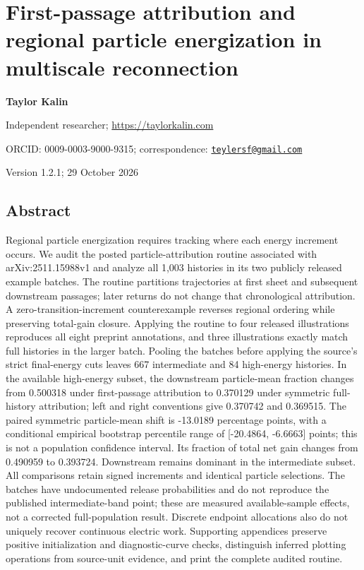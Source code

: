 \section{First-passage attribution and regional particle energization in
multiscale
reconnection}\label{first-passage-attribution-and-regional-particle-energization-in-multiscale-reconnection}

\textbf{Taylor Kalin}

Independent researcher; \url{https://taylorkalin.com}

ORCID: 0009-0003-9000-9315; correspondence:
\href{mailto:teylersf@gmail.com}{\nolinkurl{teylersf@gmail.com}}

Version 1.2.1; 29 October 2026

\subsection{Abstract}\label{abstract}

Regional particle energization requires tracking where each energy
increment occurs. We audit the posted particle-attribution routine
associated with arXiv:2511.15988v1 and analyze all 1,003 histories in
its two publicly released example batches. The routine partitions
trajectories at first sheet and subsequent downstream passages; later
returns do not change that chronological attribution. A
zero-transition-increment counterexample reverses regional ordering
while preserving total-gain closure. Applying the routine to four
released illustrations reproduces all eight preprint annotations, and
three illustrations exactly match full histories in the larger batch.
Pooling the batches before applying the source's strict final-energy
cuts leaves 667 intermediate and 84 high-energy histories. In the
available high-energy subset, the downstream particle-mean fraction
changes from 0.500318 under first-passage attribution to 0.370129 under
symmetric full-history attribution; left and right conventions give
0.370742 and 0.369515. The paired symmetric particle-mean shift is
-13.0189 percentage points, with a conditional empirical bootstrap
percentile range of {[}-20.4864, -6.6663{]} points; this is not a
population confidence interval. Its fraction of total net gain changes
from 0.490959 to 0.393724. Downstream remains dominant in the
intermediate subset. All comparisons retain signed increments and
identical particle selections. The batches have undocumented release
probabilities and do not reproduce the published intermediate-band
point; these are measured available-sample effects, not a corrected
full-population result. Discrete endpoint allocations also do not
uniquely recover continuous electric work. Supporting appendices
preserve positive initialization and diagnostic-curve checks,
distinguish inferred plotting operations from source-unit evidence, and
print the complete audited routine.

